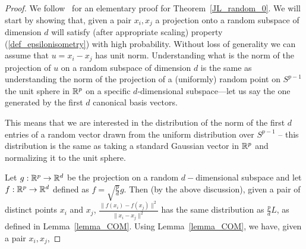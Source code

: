 \begin{proof}
We follow~\cite{Dasgupta_Gupta_JLsimpleproof} for an elementary proof for Theorem~\ref{JL_random_0}. 
We will start by showing that, given a pair $x_i,x_j$ a projection onto a random subspace of dimension $d$ will satisfy (after appropriate scaling) property (\ref{def_epsilonisometry}) with high probability. Without loss of generality we can assume that $u = x_i - x_j$ has unit norm. Understanding what is the norm of the projection of $u$ on a random subspace of dimension $d$ is the same as understanding the norm of the projection of a (uniformly) random point on $S^{p-1}$ the unit sphere in $\mathbb{R}^p$ on a specific $d$-dimensional subspace---let us say the one generated by the first $d$ canonical basis vectors.

This means that we are interested in the distribution of the norm of the first $d$ entries of a random vector drawn from the uniform distribution over $S^{p-1}$ -- this distribution is the same as taking a standard Gaussian vector in $\mathbb{R}^p$ and normalizing it to the unit sphere.

Let $g:\mathbb{R}^p\to\mathbb{R}^d$ be the projection on a random $d-$dimensional subspace and let $f:\mathbb{R}^p\to\mathbb{R}^d$ defined as $f = \sqrt{\frac{p}d}g$. Then (by the above discussion), given a pair of distinct points $x_i$ and $x_j$, $\frac{\|f(x_i)-f(x_j)\|^2}{\|x_i-x_j\|^2}$ has the same distribution as $\frac{p}dL$, as defined in Lemma~\ref{lemma_COM}. Using Lemma~\ref{lemma_COM}, we have, given a pair $x_i,x_j$,


\end{proof}
